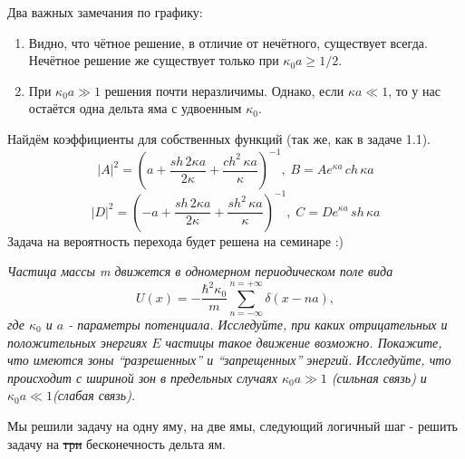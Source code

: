 Два важных замечания по графику:
\begin{enumerate}
    \item Видно, что чётное решение, в отличие от нечётного, существует всегда. Нечётное решение же существует только при $\kappa_0a\geq 1/2$.
    \item При $\kappa_0a\gg 1$ решения почти неразличимы. Однако, если $\kappa a \ll 1$, то у нас остаётся одна дельта яма с удвоенным $\kappa_0$.
\end{enumerate}
Найдём коэффициенты для собственных функций (так же, как в задаче 1.1).
\[
|A|^2 =  (a + \frac{sh\, 2\kappa a}{2\kappa} + \frac{ch ^2\,\kappa a}{\kappa})^{-1},\; B = Ae^{\kappa a}\,ch\,\kappa a
\]
\[
|D|^2 = (-a + \frac{sh\, 2\kappa a}{2\kappa} + \frac{sh ^2\,\kappa a}{\kappa})^{-1},\;C = De^{\kappa a}\,sh\,\kappa a
\]
Задача на вероятность перехода будет решена на семинаре :)

\begin{center}
    \textit{Частица массы m движется в одномерном периодическом поле вида}
    \[
    U(x) = -\frac{\hbar^2\kappa_0}{m}\sum\limits_{n=-\infty}^{n = +\infty}\delta(x-na),
    \]
    \textit{где $\kappa_0$ и $a$ - параметры потенциала. Исследуйте, при каких отрицательных и положительных энергиях $E$ частицы такое движение возможно. Покажите, что имеются зоны ``разрешенных'' и ``запрещенных'' энергий.}
    \textit{Исследуйте, что происходит с шириной зон в предельных случаях $\kappa_0a\gg1$ (сильная связь) и $\kappa_0a\ll1$(слабая связь).}
    
\end{center}
Мы решили задачу на одну яму, на две ямы, следующий логичный шаг - решить задачу на \sout{три} бесконечность дельта ям.

